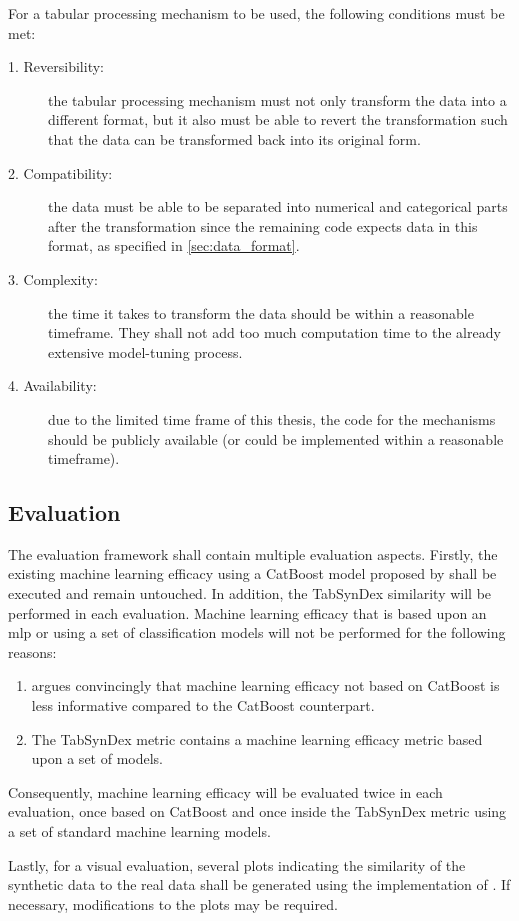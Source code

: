 For a tabular processing mechanism to be used, the following conditions must be met:

\begin{description}
	\item[1. Reversibility:] the tabular processing mechanism must not only transform the data into a different format, but it also must be able to revert the transformation
	      such that the data can be transformed back into its original form.
	\item[2. Compatibility:] the data must be able to be separated into numerical and categorical parts after the transformation
	      since the remaining code expects data in this format, as specified in \autoref{sec:data_format}.
	\item[3. Complexity:] the time it takes to transform the data should be within a reasonable timeframe. They shall not add too much computation time to the already extensive model-tuning process.
	\item[4. Availability:] due to the limited time frame of this thesis, the code for the mechanisms should be publicly available (or could be implemented within a reasonable timeframe).
\end{description}

\subsection[]{Evaluation}
\label{ch:conceptualDesign-Evaluation}
The evaluation framework shall contain multiple evaluation aspects.
Firstly, the existing machine learning efficacy using a CatBoost model proposed by \cite{kotelnikov2022TabDDPMModellingTabular} shall be executed and remain untouched.
In addition, the TabSynDex \cite{chundawat2022UniversalMetricRobust} similarity will be performed in each evaluation.
Machine learning efficacy that is based upon an \gls{mlp} or using a set of classification models will not be performed for the following reasons:
\begin{enumerate}
	\item \cite{kotelnikov2022TabDDPMModellingTabular} argues convincingly that machine learning efficacy not based on CatBoost is less informative compared to the CatBoost counterpart.
	\item The TabSynDex metric contains a machine learning efficacy metric based upon a set of models.
\end{enumerate}
Consequently, machine learning efficacy will be evaluated twice in each evaluation, once based on CatBoost and once inside the TabSynDex metric using a set of standard machine learning models.

Lastly, for a visual evaluation, several plots indicating the similarity of the synthetic data to the real data shall be generated using the implementation of \textcite{brenninkmeijer2019GenerationEvaluationTabular}.
If necessary, modifications to the plots may be required.


